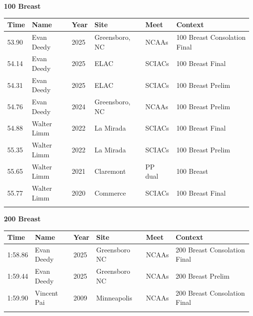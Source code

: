 \vspace{1.2em}
\noindent\begin{minipage}[t]{0.98\textwidth}
\centering
\textbf{\textcolor{teamprimary}{100 Breast}}\par
\vspace{0.5em}
\centering
\small
\renewcommand{\arraystretch}{1.0}
\setlength{\tabcolsep}{4pt}
\begin{tabular}{@{}p{2.0cm}p{3.2cm}p{1.2cm}p{2.0cm}p{2.0cm}p{2.5cm}@{}}
\toprule
\textbf{Time} & \textbf{Name} & \textbf{Year} & \textbf{Site} & \textbf{Meet} & \textbf{Context} \\
\midrule
53.90 & Evan Deedy & 2025 & Greensboro, NC & NCAAs & 100 Breast Consolation Final \\
54.14 & Evan Deedy & 2025 & ELAC & SCIACs & 100 Breast Final \\
54.31 & Evan Deedy & 2025 & ELAC & SCIACs & 100 Breast Prelim \\
54.76 & Evan Deedy & 2024 & Greensboro, NC & NCAAs & 100 Breast Prelim \\
54.88 & Walter Limm & 2022 & La Mirada & SCIACs & 100 Breast Final \\
55.35 & Walter Limm & 2022 & La Mirada & SCIACs & 100 Breast Prelim \\
55.65 & Walter Limm & 2021 & Claremont & PP dual & 100 Breast \\
55.77 & Walter Limm & 2020 & Commerce & SCIACs & 100 Breast Final \\
\bottomrule
\vspace{0.5em}
\end{tabular}
\end{minipage}
\vspace{1.2em}
\noindent\begin{minipage}[t]{0.98\textwidth}
\centering
\textbf{\textcolor{teamprimary}{200 Breast}}\par
\vspace{0.5em}
\centering
\small
\renewcommand{\arraystretch}{1.0}
\setlength{\tabcolsep}{4pt}
\begin{tabular}{@{}p{2.0cm}p{3.2cm}p{1.2cm}p{2.0cm}p{2.0cm}p{2.5cm}@{}}
\toprule
\textbf{Time} & \textbf{Name} & \textbf{Year} & \textbf{Site} & \textbf{Meet} & \textbf{Context} \\
\midrule
1:58.86 & Evan Deedy & 2025 & Greensboro NC & NCAAs & 200 Breast Consolation Final \\
1:59.44 & Evan Deedy & 2025 & Greensboro NC & NCAAs & 200 Breast Prelim \\
1:59.90 & Vincent Pai & 2009 & Minneapolis & NCAAs & 200 Breast Consolation Final \\
\bottomrule
\vspace{0.5em}
\end{tabular}
\end{minipage}
